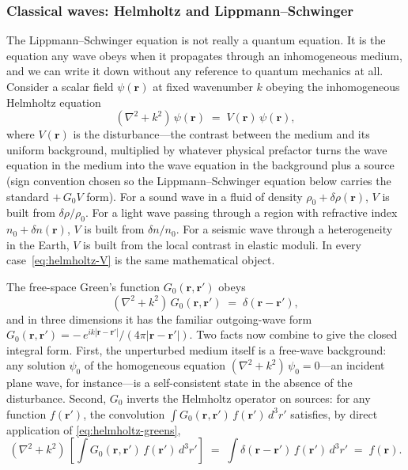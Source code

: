 \documentclass[11pt]{article}
\begin{document}
\subsubsection{Classical waves: Helmholtz and Lippmann--Schwinger}

The Lippmann--Schwinger equation is not really a quantum equation.
It is the equation any wave obeys when it propagates through an
inhomogeneous medium, and we can write it down without any reference
to quantum mechanics at all.  Consider a scalar field
$\psi(\mathbf{r})$ at fixed wavenumber $k$ obeying the inhomogeneous
Helmholtz equation
\begin{equation}
(\nabla^2 + k^2)\,\psi(\mathbf{r}) \;=\; V(\mathbf{r})\,\psi(\mathbf{r}),
\label{eq:helmholtz-V}
\end{equation}
where $V(\mathbf{r})$ is the disturbance---the contrast between the
medium and its uniform background, multiplied by whatever physical
prefactor turns the wave equation in the medium into the wave
equation in the background plus a source (sign convention chosen so
the Lippmann--Schwinger equation below carries the standard $+\,G_0 V$
form).  For a sound wave in a
fluid of density $\rho_0 + \delta\rho(\mathbf{r})$, $V$ is built from
$\delta\rho/\rho_0$.  For a light wave passing through a region with
refractive index $n_0 + \delta n(\mathbf{r})$, $V$ is built from
$\delta n / n_0$.  For a seismic wave through a heterogeneity in the
Earth, $V$ is built from the local contrast in elastic moduli.  In
every case~\eqref{eq:helmholtz-V} is the same mathematical object.

The free-space Green's function $G_0(\mathbf{r}, \mathbf{r}')$ obeys
\begin{equation}
(\nabla^2 + k^2)\, G_0(\mathbf{r}, \mathbf{r}')
\;=\; \delta(\mathbf{r} - \mathbf{r}'),
\label{eq:helmholtz-greens}
\end{equation}
and in three dimensions it has the familiar outgoing-wave form
$G_0(\mathbf{r}, \mathbf{r}') = -\,e^{ik|\mathbf{r}-\mathbf{r}'|} /
(4\pi |\mathbf{r}-\mathbf{r}'|)$.  Two facts now combine to give the
closed integral form.  First, the unperturbed medium itself is a
free-wave background: any solution $\psi_0$ of the homogeneous
equation $(\nabla^2 + k^2)\,\psi_0 = 0$---an incident plane wave, for
instance---is a self-consistent state in the absence of the
disturbance.  Second, $G_0$ inverts the Helmholtz operator on
sources: for any function $f(\mathbf{r}')$, the convolution
$\int G_0(\mathbf{r}, \mathbf{r}')\,f(\mathbf{r}')\,d^3\!r'$
satisfies, by direct application of \eqref{eq:helmholtz-greens},
\begin{equation}
(\nabla^2 + k^2)\,\!\left[\int G_0(\mathbf{r}, \mathbf{r}')\,
f(\mathbf{r}')\,d^3\!r'\right]
\;=\; \int \delta(\mathbf{r} - \mathbf{r}')\,f(\mathbf{r}')\,d^3\!r'
\;=\; f(\mathbf{r}).
\end{equation}
\end{document}
